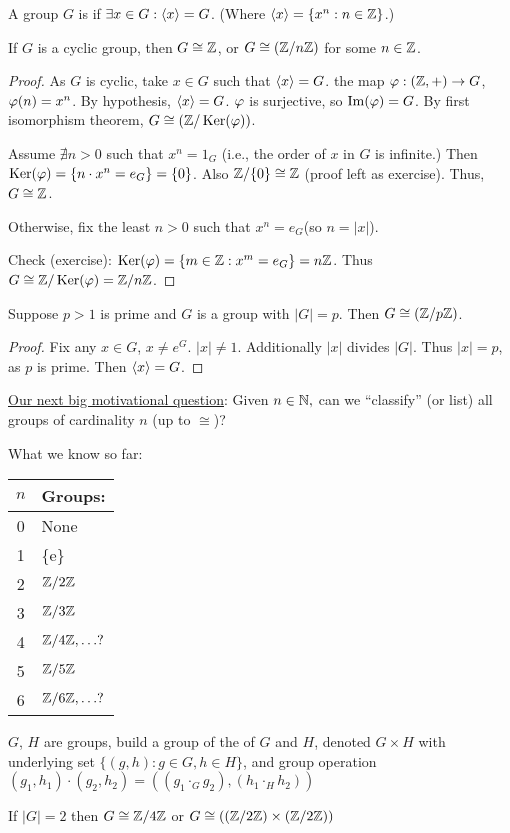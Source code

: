 \documentclass[notes.tex]{subfiles}
\begin{document}
\begin{defn}
	A group $G$ is  if $\exists x \in G: \left\langle{x}\right\rangle = G$. (Where $ \left\langle{x}\right\rangle = \{x^n : n\in\mathbb{Z}\}$.)
\end{defn}

\begin{proposition}
	If $G$ is a cyclic group, then $G\cong\mathbb{Z}$, or $G\cong (\mathbb{Z}/n\mathbb{Z})$ for some $n\in\mathbb{Z}$.
\end{proposition}

\begin{proof}
	As $G$ is cyclic, take $x\in G$ such that $\left\langle{x}\right\rangle = G$.
	the map $\varphi:(\mathbb{Z}, +)\to G$, $\varphi(n) = x^n$.
	By hypothesis, $\left\langle{x}\right\rangle = G$.
	$\varphi$ is surjective, so $\operatorname{\mathrm{Im}}(\varphi) = G$.
	By first isomorphism theorem, $G\cong(\mathbb{Z}/\operatorname{\mathrm{Ker}}(\varphi))$.

	Assume $\nexists n > 0$ such that $x^n = 1_G$ (i.e., the order of $x$ in $G$ is infinite.)
	Then $\operatorname{\mathrm{Ker}}(\varphi) = \{n\cdot x^n = e_G\} = \{0\}$. Also $\mathbb{Z}/\{0\} \cong\mathbb{Z}$ (proof left as exercise).
	Thus, $G\cong\mathbb{Z}$.

	Otherwise, fix the least $n>0$ such that $x^n = e_G$(so $n = |x|$).

	Check (exercise): $\operatorname{\mathrm{Ker}}(\varphi) = \{m\in\mathbb{Z} : x^m = e_G\} = n\mathbb{Z}$.
	Thus $G\cong\mathbb{Z}/\operatorname{\mathrm{Ker}}(\varphi)= \mathbb{Z}/n\mathbb{Z}$.
\end{proof}

\begin{corollary}
	Suppose $p > 1$ is prime and $G$ is a group with $|G| = p$. Then $G\cong(\mathbb{Z}/p\mathbb{Z})$.
\end{corollary}
\begin{proof}
	Fix any $x\in G$, $x\ne e^G$. $|x| \ne 1$.
	Additionally $|x|$ divides $|G|$. Thus $|x| = p$, as $p$ is prime. Then $\left\langle{x}\right\rangle = G$.
\end{proof}

\underline{Our next big motivational question}:
Given $n\in \mathbb{N},$ can we ``classify'' (or list) all groups of cardinality $n$ (up to $\cong$)?

What we know so far:

\begin{tabular}{c|l}
$n$ & Groups:\\\hline
0 & None\\
1 & \{e\}\\
2 & $\mathbb{Z}/2\mathbb{Z}$\\
3 & $\mathbb{Z}/3\mathbb{Z}$\\
4 & $\mathbb{Z}/4\mathbb{Z}, \ldots?$\\
5 & $\mathbb{Z}/5\mathbb{Z}$\\
6 & $\mathbb{Z}/6\mathbb{Z}, \ldots?$
\end{tabular}

\begin{defn}
	$G$, $H$ are groups, build a group of the  of $G$ and $H$, denoted $G\times H$ with underlying set $\{(g, h) : g\in G, h\in H\}$, and group operation $(g_1, h_1)\cdot(g_2, h_2) = ((g_1\cdot_Gg_2), (h_1\cdot_Hh_2))$
\end{defn}

\begin{proposition}
	If $|G| = 2$ then $G\cong\mathbb{Z}/4\mathbb{Z}$ or $G\cong ((\mathbb{Z}/2\mathbb{Z}) \times (\mathbb{Z}/2\mathbb{Z}))$
\end{proposition}
\end{document}
